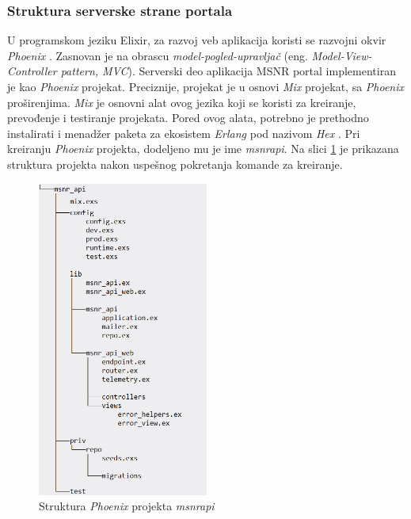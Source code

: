 \documentclass[12pt,oneside]{memoir}
\begin{document}
\subsubsection{Struktura serverske strane portala}
\par U programskom jeziku Elixir, za razvoj veb aplikacija koristi se razvojni okvir \emph{Phoenix} \cite{phx}. Zasnovan je na obrascu \emph{model-pogled-upravljač} (eng. \emph{Model-View-Controller pattern, MVC}). Serverski deo aplikacija MSNR portal implementiran je kao \emph{Phoenix} projekat. Preciznije, projekat je u osnovi \emph{Mix} projekat, sa \emph{Phoenix} proširenjima. \emph{Mix} je osnovni alat ovog jezika koji se koristi za kreiranje, prevođenje i testiranje projekata. Pored ovog alata, potrebno je prethodno instalirati i menadžer paketa za ekosistem \emph{Erlang} pod nazivom \emph{Hex} \cite{hex}. Pri kreiranju \emph{Phoenix} projekta, dodeljeno mu je ime \emph{msnr{\textunderscore}api}. Na slici \ref{fig:msnr-str} je prikazana struktura projekta nakon uspešnog pokretanja komande za kreiranje. 

\begin{figure}[!ht]
  \centering
  \label{fig:msnr-str}
  \includegraphics[width=0.5\textwidth]{msnr-str.png}
  \caption{Struktura \emph{Phoenix} projekta \emph{msnr{\textunderscore}api} \cite{rad}}
\end{figure}
\end{document}
